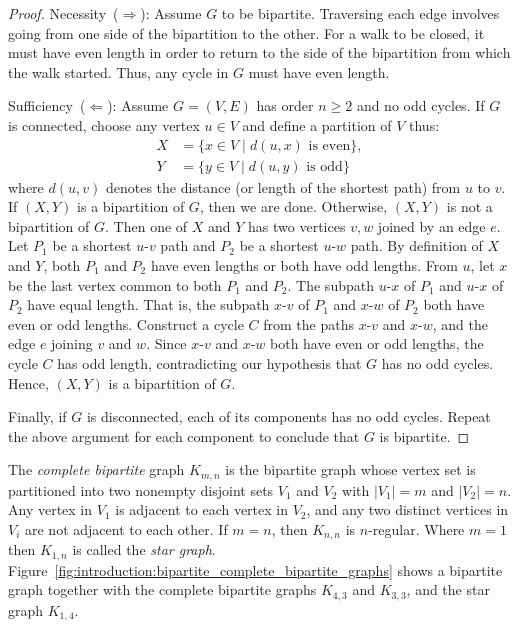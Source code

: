 \begin{proof}
Necessity~($\Longrightarrow$): Assume $G$ to be bipartite. Traversing
each edge involves going from one side of the bipartition to the
other. For a walk to be closed, it must have even length in order to
return to the side of the bipartition from which the walk
started. Thus, any cycle in $G$ must have even length.

Sufficiency~($\Longleftarrow$): Assume $G = (V, E)$ has order
$n \geq 2$ and no odd cycles. If $G$ is connected, choose any vertex
$u \in V$ and define a partition of $V$ thus:
\begin{align*}
X &= \{x \in V \mid d(u,x) \text{ is even}\}, \\
Y &= \{y \in V \mid d(u,y) \text{ is odd}\}
\end{align*}
where $d(u,v)$ denotes the distance (or length of the shortest path)
from $u$ to $v$. If $(X, Y)$ is a bipartition of $G$, then we are
done. Otherwise, $(X, Y)$ is not a bipartition of $G$. Then one of $X$
and $Y$ has two vertices $v,w$ joined by an edge $e$. Let $P_1$ be a
shortest $u$-$v$ path and $P_2$ be a shortest $u$-$w$ path. By
definition of $X$ and $Y$, both $P_1$ and $P_2$ have even lengths or
both have odd lengths. From $u$, let $x$ be the last vertex common to
both $P_1$ and $P_2$. The subpath $u$-$x$ of $P_1$ and $u$-$x$ of
$P_2$ have equal length. That is, the subpath $x$-$v$ of $P_1$ and
$x$-$w$ of $P_2$ both have even or odd lengths. Construct a cycle $C$
from the paths $x$-$v$ and $x$-$w$, and the edge $e$ joining $v$ and
$w$. Since $x$-$v$ and $x$-$w$ both have even or odd lengths, the
cycle $C$ has odd length, contradicting our hypothesis that $G$ has no
odd cycles. Hence, $(X,Y)$ is a bipartition of $G$.

Finally, if $G$ is disconnected, each of its components has no odd
cycles. Repeat the above argument for each component to conclude that
$G$ is bipartite.
\end{proof}

The \emph{complete bipartite} graph
$K_{m,n}$ is the bipartite graph whose vertex set is
partitioned into two nonempty disjoint sets $V_1$ and $V_2$ with
$|V_1| = m$ and $|V_2| = n$. Any vertex in $V_1$ is adjacent to each
vertex in $V_2$, and any two distinct vertices in $V_i$ are not
adjacent to each other. If $m = n$, then $K_{n,n}$ is
$n$-regular. Where $m = 1$ then $K_{1,n}$ is called the
\emph{star graph}.
Figure~\ref{fig:introduction:bipartite_complete_bipartite_graphs}
shows a bipartite graph together with the complete bipartite graphs
$K_{4,3}$ and $K_{3,3}$, and the star graph $K_{1,4}$.

